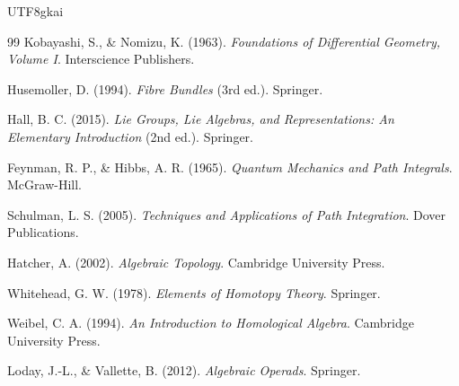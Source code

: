 \documentclass[12pt]{article}
\begin{document}
\begin{CJK*}{UTF8}{gkai}
\begin{thebibliography}{99}
Kobayashi, S., \& Nomizu, K. (1963).
\newblock \emph{Foundations of Differential Geometry, Volume I}.
\newblock Interscience Publishers.

Husemoller, D. (1994).
\newblock \emph{Fibre Bundles} (3rd ed.).
\newblock Springer.

Hall, B. C. (2015).
\newblock \emph{Lie Groups, Lie Algebras, and Representations: An Elementary Introduction} (2nd ed.).
\newblock Springer.

Feynman, R. P., \& Hibbs, A. R. (1965).
\newblock \emph{Quantum Mechanics and Path Integrals}.
\newblock McGraw-Hill.

Schulman, L. S. (2005).
\newblock \emph{Techniques and Applications of Path Integration}.
\newblock Dover Publications.

Hatcher, A. (2002).
\newblock \emph{Algebraic Topology}.
\newblock Cambridge University Press.

Whitehead, G. W. (1978).
\newblock \emph{Elements of Homotopy Theory}.
\newblock Springer.

Weibel, C. A. (1994).
\newblock \emph{An Introduction to Homological Algebra}.
\newblock Cambridge University Press.

Loday, J.-L., \& Vallette, B. (2012).
\newblock \emph{Algebraic Operads}.
\newblock Springer.
\end{thebibliography}

\end{CJK*}
\end{document}
